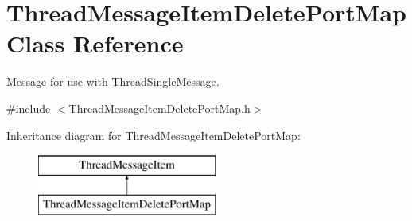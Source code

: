 \hypertarget{class_thread_message_item_delete_port_map}{
\section{ThreadMessageItemDeletePortMap Class Reference}
\label{class_thread_message_item_delete_port_map}
}


Message for use with \hyperlink{class_thread_single_message}{ThreadSingleMessage}.  




{\ttfamily \#include $<$ThreadMessageItemDeletePortMap.h$>$}

Inheritance diagram for ThreadMessageItemDeletePortMap:\begin{figure}[H]
\begin{center}
\leavevmode
\includegraphics[height=2.000000cm]{class_thread_message_item_delete_port_map}
\end{center}
\end{figure}
